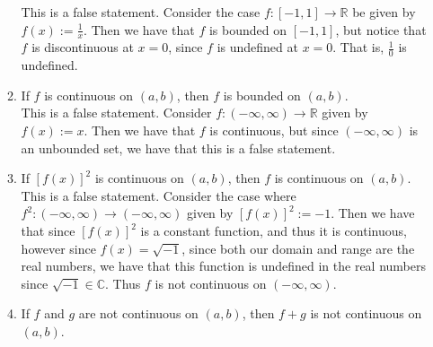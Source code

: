 \documentclass[12pt,letterpaper]{article}
\newcommand{\R}{\mathbb{R}}
\newcommand{\C}{\mathbb{C}}
\theoremstyle{case}
\theoremstyle{definition}
\begin{document}
\begin{enumerate}
\begin{enumerate}
				This is a false statement. Consider the case $f:[-1,1] \to \R$ be given by $f(x):=\frac{1}{x}$. Then we have that $f$ is bounded on $[-1,1]$, but notice that $f$ is discontinuous at $x=0$, since $f$ is undefined at $x=0$. That is, $\frac{1}{0}$ is undefined.\\
				\item If $f$ is continuous on $(a,b)$, then $f$ is bounded on $(a,b)$.\\
				
				This is a false statement. Consider $f:(-\infty, \infty) \to \R$ given by $f(x):=x$. Then we have that $f$ is continuous, but since $(-\infty, \infty)$ is an unbounded set, we have that this is a false statement.\\
				\item If $[f(x)]^2$ is continuous on $(a,b)$, then $f$ is continuous on $(a,b)$.\\
				
				This is a false statement. Consider the case where $f^2:(-\infty, \infty) \to (-\infty, \infty)$ given by $[f(x)]^2:=-1$. Then we have that since $[f(x)]^2$ is a constant function, and thus it is continuous, however since $f(x)=\sqrt{-1}$, since both our domain and range are the real numbers, we have that this function is undefined in the real numbers since $\sqrt{-1} \in \C$. Thus $f$ is not continuous on $(-\infty, \infty)$.\\
				\item If $f$ and $g$ are not continuous on $(a,b)$, then $f+g$ is not continuous on $(a,b)$.\\
				

\end{enumerate}
\end{enumerate}
\end{document}
